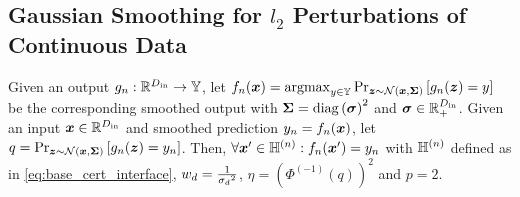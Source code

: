 \subsection{Gaussian Smoothing for \texorpdfstring{$l_2$}{l2} Perturbations of Continuous Data}
\begin{proposition}\label{prop:gaussian_smoothing}
Given an output $g_n : {\mathbb{R}}^{D_\mathrm{in}} \rightarrow {\mathbb{Y}}$, let 
$f_n({\bm{x}}) = \mathrm{argmax}_{y \in {\mathbb{Y}}} \Pr_{{\bm{z}} \sim \mathcal{N}({\bm{x}}, {\bm{\Sigma}})}\left[g_n({\bm{z}}) = y\right]$ be the corresponding smoothed output with ${\bm{\Sigma}} = \mathrm{diag}\left({\bm{\sigma}}\right)^2$ and ${\bm{\sigma}} \in {\mathbb{R}}_+^{D_\mathrm{in}}$.
Given an input ${\bm{x}} \in {\mathbb{R}}^{D_\mathrm{in}}$ and smoothed prediction ${y}_n = f_n({\bm{x}})$, 
let $q = \Pr_{{\bm{z}} \sim \mathcal{N}({\bm{x}}, {\bm{\Sigma}})}\left[g_n({\bm{z}}) = {y}_n \right]$.
Then, $\forall {\bm{x}}' \in {\mathbb{H}}^{(n)}: f_n({\bm{x}}') = {y}_n$ with ${\mathbb{H}}^{(n)}$ defined as in \autoref{eq:base_cert_interface},
${w}_{d} = \frac{1}{{{\sigma}_d}^2}$, $\eta = \left(\Phi^{(-1)}(q)\right)^2$ and $p=2$.
\end{proposition}
